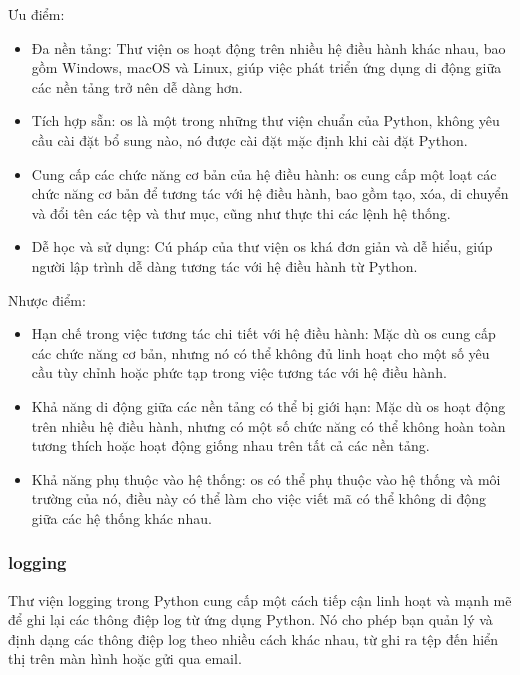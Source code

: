 \documentclass{article} %
\begin{document}
Ưu điểm:
\begin{itemize}
    \item Đa nền tảng: Thư viện os hoạt động trên nhiều hệ điều hành khác nhau, bao gồm Windows, macOS và Linux, giúp việc phát triển ứng dụng di động giữa các nền tảng trở nên dễ dàng hơn.
    \item Tích hợp sẵn: os là một trong những thư viện chuẩn của Python, không yêu cầu cài đặt bổ sung nào, nó được cài đặt mặc định khi cài đặt Python.
    \item Cung cấp các chức năng cơ bản của hệ điều hành: os cung cấp một loạt các chức năng cơ bản để tương tác với hệ điều hành, bao gồm tạo, xóa, di chuyển và đổi tên các tệp và thư mục, cũng như thực thi các lệnh hệ thống.
    \item Dễ học và sử dụng: Cú pháp của thư viện os khá đơn giản và dễ hiểu, giúp người lập trình dễ dàng tương tác với hệ điều hành từ Python.
\end{itemize}
\hspace{0.0em} Nhược điểm:
\begin{itemize}
    \item Hạn chế trong việc tương tác chi tiết với hệ điều hành: Mặc dù os cung cấp các chức năng cơ bản, nhưng nó có thể không đủ linh hoạt cho một số yêu cầu tùy chỉnh hoặc phức tạp trong việc tương tác với hệ điều hành.
    \item Khả năng di động giữa các nền tảng có thể bị giới hạn: Mặc dù os hoạt động trên nhiều hệ điều hành, nhưng có một số chức năng có thể không hoàn toàn tương thích hoặc hoạt động giống nhau trên tất cả các nền tảng.
    \item Khả năng phụ thuộc vào hệ thống: os có thể phụ thuộc vào hệ thống và môi trường của nó, điều này có thể làm cho việc viết mã có thể không di động giữa các hệ thống khác nhau.
\end{itemize}
\subsubsection{logging}
Thư viện logging trong Python cung cấp một cách tiếp cận linh hoạt và mạnh mẽ để ghi lại các thông điệp log từ ứng dụng Python. Nó cho phép bạn quản lý và định dạng các thông điệp log theo nhiều cách khác nhau, từ ghi ra tệp đến hiển thị trên màn hình hoặc gửi qua email.
\end{document}
